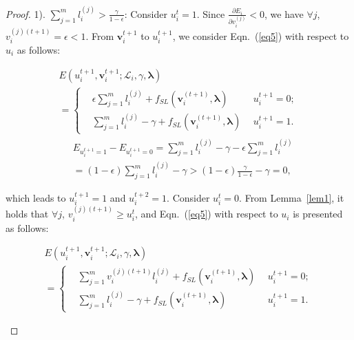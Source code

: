 \documentclass[journal]{IEEEtran}
\begin{document}
{{\begin{proof}
		1). $\sum_{j=1}^{m}l_i^{(j)} > \frac{\gamma}{1-\epsilon}$: Consider $u_i^t=1$. Since $\frac{\partial E_i}{\partial v^{(j)}_i}<0$, we have $\forall j$, $v_i^{(j)(t+1)}=\epsilon<1$. From $\mathbf{v}_i^{t+1}$ to $u_i^{t+1}$, we consider Eqn.~(\ref{eq5}) with respect to $u_i$ as follows:	
		\begin{small}
			\begin{equation}
			\begin{gathered}
			E(u_i^{t+1},\mathbf{v}_i^{t+1};\mathcal{L}_{i},\gamma,{\bm \lambda})  \\
			=\left\{
			\begin{aligned}	
			&\epsilon\sum_{j=1}^{m}l_i^{(j)} + f_{SL}(\mathbf{v}^{(t+1)}_i, \bm \lambda) \ \  &u_i^{t+1}=0; \\
			&\sum_{j=1}^{m}l_i^{(j)} -\gamma + f_{SL}(\mathbf{v}^{(t+1)}_i, \bm \lambda)\ \  &u_i^{t+1}=1. 
			\end{aligned}
			\right.
			\end{gathered}\label{u}
			\end{equation}
			\begin{displaymath}
			\begin{aligned}
			&E_{u_i^{t+1}=1}-E_{u_i^{t+1}=0} = \sum_{j=1}^{m}l_i^{(j)} -\gamma - \epsilon\sum_{j=1}^{m}l_i^{(j)} \\&= (1-\epsilon)\sum_{j=1}^{m}l_i^{(j)}-\gamma > (1-\epsilon)\frac{\gamma}{1-\epsilon}-\gamma = 0, 
			\end{aligned}
			\end{displaymath}
		\end{small}which leads to $u^{t+1}_i=1$ and $u^{t+2}_i=1$. Consider $u_i^t=0$. From Lemma~\ref{lem1}, it holds that $\forall j$, $v_i^{(j)(t+1)} \geq u_i^t$, and Eqn.~(\ref{eq5}) with respect to $u_i$ is presented as follows:	
			\begin{small}
			\begin{equation}
			\begin{gathered}
			E(u_i^{t+1},\mathbf{v}_i^{t+1};\mathcal{L}_{i},\gamma,{\bm \lambda})  \\
			=\left\{
			\begin{aligned}	
			&\sum_{j=1}^{m}v^{(j)(t+1)}_il_i^{(j)} + f_{SL}(\mathbf{v}^{(t+1)}_i, \bm \lambda) \ \  &u_i^{t+1}=0; \\
			&\sum_{j=1}^{m}l_i^{(j)} -\gamma + f_{SL}(\mathbf{v}^{(t+1)}_i, \bm \lambda)\ \  &u_i^{t+1}=1. 
			\end{aligned}

\end{gathered}
\end{equation}
\end{small}
\end{proof}}}
\end{document}
